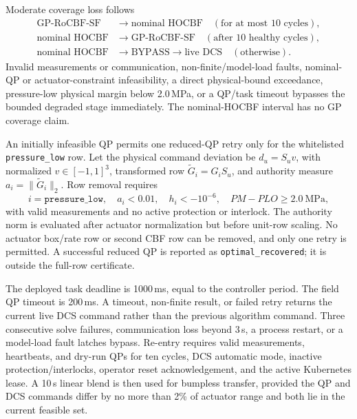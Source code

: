 Moderate coverage loss follows
\begin{equation}
\begin{aligned}
\text{GP-RoCBF-SF}
&\rightarrow \text{nominal HOCBF}
\quad(\text{for at most 10 cycles}),\\
\text{nominal HOCBF}
&\rightarrow \text{GP-RoCBF-SF}
\quad(\text{after 10 healthy cycles}),\\
\text{nominal HOCBF}
&\rightarrow \text{BYPASS}\rightarrow\text{live DCS}
\quad(\text{otherwise}).
\end{aligned}
\label{eq:S_degraded_state}
\end{equation}
Invalid measurements or communication, non-finite/model-load faults, nominal-QP or actuator-constraint infeasibility, a direct physical-bound exceedance, pressure-low physical margin below 2.0\,MPa, or a QP/task timeout bypasses the bounded degraded stage immediately. The nominal-HOCBF interval has no GP coverage claim.

An initially infeasible QP permits one reduced-QP retry only for the whitelisted \texttt{pressure\_low} row. Let the physical command deviation be $d_u=S_uv$, with normalized $v\in[-1,1]^3$, transformed row $\tilde G_i=G_iS_u$, and authority measure $a_i=\|\tilde G_i\|_2$. Row removal requires
\begin{equation}
    i=\texttt{pressure\_low},\quad
    a_i<0.01,\quad h_i<-10^{-6},\quad
    PM-PLO\geq2.0\ \mathrm{MPa},
    \label{eq:S_row_drop_guard}
\end{equation}
with valid measurements and no active protection or interlock. The authority norm is evaluated after actuator normalization but before unit-row scaling. No actuator box/rate row or second CBF row can be removed, and only one retry is permitted. A successful reduced QP is reported as \texttt{optimal\_recovered}; it is outside the full-row certificate.

The deployed task deadline is 1000\,ms, equal to the controller period. The field QP timeout is 200\,ms. A timeout, non-finite result, or failed retry returns the current live DCS command rather than the previous algorithm command. Three consecutive solve failures, communication loss beyond 3\,s, a process restart, or a model-load fault latches bypass. Re-entry requires valid measurements, heartbeats, and dry-run QPs for ten cycles, DCS automatic mode, inactive protection/interlocks, operator reset acknowledgement, and the active Kubernetes lease. A 10\,s linear blend is then used for bumpless transfer, provided the QP and DCS commands differ by no more than 2\% of actuator range and both lie in the current feasible set.

